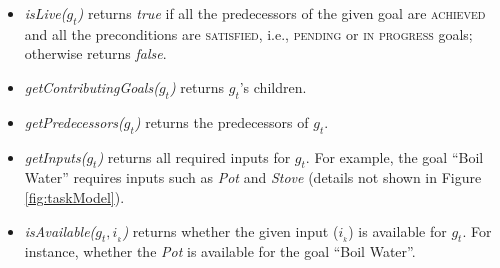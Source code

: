 \documentclass{article}
\begin{document}
\begin{itemize}[leftmargin=2pt]
  \item \textit{isLive($g_t$)} returns \textit{true} if all the predecessors of
  the given goal are \textsc{achieved} and all the preconditions are
  \textsc{satisfied}, i.e., \textsc{pending} or \textsc{in progress} goals;
  otherwise returns \textit{false}.
  
  
  
  
  
  \item \textit{getContributingGoals($g_t$)} returns $g_t$'s children.
    
  \item \textit{getPredecessors($g_t$)} returns the predecessors of $g_t$.
  
  \item \textit{getInputs($g_t$)} returns all required inputs for $g_t$. For
  example, the goal ``Boil Water'' requires inputs such as \textit{Pot} and
  \textit{Stove} (details not shown in Figure \ref{fig:taskModel}).
  
  \item \textit{isAvailable($g_t, i_{_k}$)} returns whether the given input
  ($i_{_k}$) is available for $g_t$. For instance, whether the \textit{Pot} is
  available for the goal ``Boil Water''.
  
  

\end{itemize}
\end{document}
